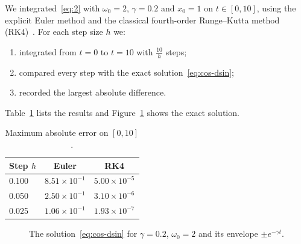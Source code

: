\documentclass[11pt,a4paper]{article}
\begin{document}
We integrated~\eqref{eq:2} with $\omega_{0}=2$, $\gamma=0.2$ and $x_{0}=1$ on $t\in[0,10]$, using the explicit Euler method and the classical fourth-order Runge--Kutta method (RK4)~\cite{ref3}. For each step size $h$ we:
\begin{enumerate}
  \item integrated from $t=0$ to $t=10$ with $\frac{10}{h}$ steps;
  \item compared every step with the exact solution~\eqref{eq:cos-dsin};
  \item recorded the largest absolute difference.
\end{enumerate}
Table~\ref{tab:results} lists the results and Figure~\ref{fig:the-solution} shows the exact solution.

\begin{table}[htbp]
  \centering
  \caption{Maximum absolute error on $[0,10]$.}
  \label{tab:results}
  \begin{tabular}{lcc}
    \toprule
    \textbf{Step $h$} & \textbf{Euler} & \textbf{RK4} \\
    \midrule
    0.100 & $8.51\times10^{-1}$ & $5.00\times10^{-5}$ \\
    0.050 & $2.50\times10^{-1}$ & $3.10\times10^{-6}$ \\
    0.025 & $1.06\times10^{-1}$ & $1.93\times10^{-7}$ \\
    \bottomrule
  \end{tabular}
\end{table}

\begin{figure}[htbp]
  \centering
  \caption{The solution~\eqref{eq:cos-dsin} for $\gamma=0.2$, $\omega_{0}=2$ and its envelope $\pm e^{-\gamma t}$.}
  \label{fig:the-solution}
\end{figure}
\end{document}
